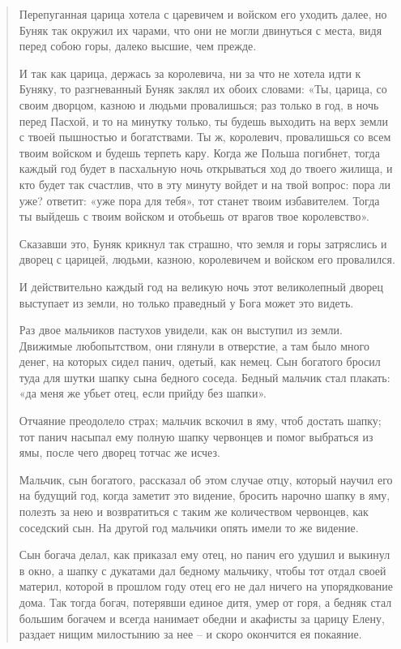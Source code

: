 \begin{quotation}
Перепуганная царица хотела с царевичем и войском его уходить далее, но Буняк так окружил их чарами, что они не могли двинуться с места, видя перед собою горы, далеко высшие, чем прежде.

И так как царица, держась за королевича, ни за что не хотела идти к Буняку, то разгневанный Буняк заклял их обоих словами: «Ты, царица, со своим дворцом, казною и людьми провалишься; раз только в год, в ночь перед Пасхой, и то на минутку только, ты будешь выходить на верх земли с твоей пышностью и богатствами. Ты ж, королевич, провалишься со всем твоим войском и будешь терпеть кару. Когда же Польша погибнет, тогда каждый год будет в пасхальную ночь открываться ход до твоего жилища, и кто будет так счастлив, что в эту минуту войдет и на твой вопрос: пора ли уже? ответит: «уже пора для тебя», тот станет твоим избавителем. Тогда ты выйдешь с твоим войском и отобьешь от врагов твое королевство».

Сказавши это, Буняк крикнул так страшно, что земля и горы затряслись и дворец с царицей, людьми, казною, королевичем и войском его провалился.

И действительно каждый год на великую ночь этот великолепный дворец выступает из земли, но только праведный у Бога может это видеть.

Раз двое мальчиков пастухов увидели, как он выступил из земли. Движимые любопытством, они глянули в отверстие, а там было много денег, на которых сидел панич, одетый, как немец. Сын богатого бросил туда для шутки шапку сына бедного соседа. Бедный мальчик стал плакать: «да меня же убьет отец, если прийду без шапки».

Отчаяние преодолело страх; мальчик вскочил в яму, чтоб достать шапку; тот панич насыпал ему полную шапку червонцев и помог выбраться из ямы, после чего дворец тотчас же исчез.

Мальчик, сын богатого, рассказал об этом случае отцу, который научил его на будущий год, когда заметит это видение, бросить нарочно шапку в яму, полезть за нею и возвратиться с таким же количеством червонцев, как соседский сын. На другой год мальчики опять имели то же видение.

Сын богача делал, как приказал ему отец, но панич его удушил и выкинул в окно, а шапку с дукатами дал бедному мальчику, чтобы тот отдал своей материл, которой в прошлом году отец его не дал ничего на упорядкование дома. Так тогда богач, потерявши единое дитя, умер от горя, а бедняк стал большим богачем и всегда нанимает обедни и акафисты за царицу Елену, раздает нищим милостынию за нее – и скоро окончится ея покаяние.


\end{quotation}
